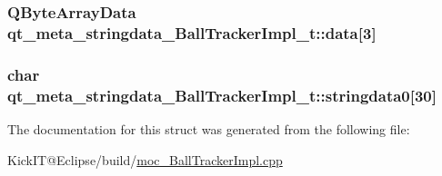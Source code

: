 \subsubsection[{\texorpdfstring{data}{data}}]{\setlength{\rightskip}{0pt plus 5cm}Q\+Byte\+Array\+Data qt\+\_\+meta\+\_\+stringdata\+\_\+\+Ball\+Tracker\+Impl\+\_\+t\+::data\mbox{[}3\mbox{]}}\hypertarget{structqt__meta__stringdata___ball_tracker_impl__t_aaa7d7ef4a4a293040f1ceb14790880db}{}\label{structqt__meta__stringdata___ball_tracker_impl__t_aaa7d7ef4a4a293040f1ceb14790880db}
\subsubsection[{\texorpdfstring{stringdata0}{stringdata0}}]{\setlength{\rightskip}{0pt plus 5cm}char qt\+\_\+meta\+\_\+stringdata\+\_\+\+Ball\+Tracker\+Impl\+\_\+t\+::stringdata0\mbox{[}30\mbox{]}}\hypertarget{structqt__meta__stringdata___ball_tracker_impl__t_a04a60b2f79a2e3d26ef56213f357c24f}{}\label{structqt__meta__stringdata___ball_tracker_impl__t_a04a60b2f79a2e3d26ef56213f357c24f}


The documentation for this struct was generated from the following file\+:\begin{DoxyCompactItemize}
\item 
Kick\+I\+T@\+Eclipse/build/\hyperlink{moc___ball_tracker_impl_8cpp}{moc\+\_\+\+Ball\+Tracker\+Impl.\+cpp}\end{DoxyCompactItemize}

